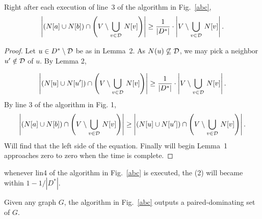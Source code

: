 \documentclass[12pt]{article}
\begin{document}
\begin{lemma}
Right after each execution of line~3 of the algorithm in Fig.~\ref{abc},
\begin{equation}
\left|\left(N[a]\cup N[b]\right)\cap \left(V\setminus \bigcup_{v\in {\cal D}}\,N[v]\right)\right|
\ge \frac{1}{|D^*|}
\cdot\left|V\setminus \bigcup_{v\in {\cal D}}\,N[v]\right|.
\end{equation}
\end{lemma}
\begin{proof}
Let $u\in D^*\setminus {\cal D}$ be as in Lemma~2. As $N(u)\not\subseteq {\cal D}$, we may pick a neighbor $u'\notin {\cal D}$ of $u$. By Lemma 2,

\begin{equation}
\left|\left(N[u]\cup N[u']\right)\cap \left(V\setminus \bigcup_{v\in {\cal D}}\,N[v]\right)\right|
\ge \frac{1}{|D^*|}
\cdot\left|V\setminus \bigcup_{v\in {\cal D}}\,N[v]\right|.
\end{equation}
By line 3 of the algorithm in Fig. 1, 
$$
\left|\left(N[a]\cup N[b]\right)\cap \left(V\setminus \bigcup_{v\in {\cal D}}\,N[v]\right)\right| \geq \left|\left(N[u]\cup N[u']\right)\cap \left(V\setminus \bigcup_{v\in {\cal D}}\,N[v]\right)\right|.
$$
Will find that the left side of the equation. Finally will begin Lemma~1 approaches zero to zero when the time is complete.
\end{proof}
\begin{lemma}
whenever lin4 of the algorithm in Fig.~\ref{abc} is executed, the (2) will became within $1-1/|D^*|$.

\end{lemma}


\begin{lemma}
Given any graph $G$, the algorithm in Fig.~\ref{abc} outputs a paired-dominating set of $G$.
\end{lemma}



\end{document}
